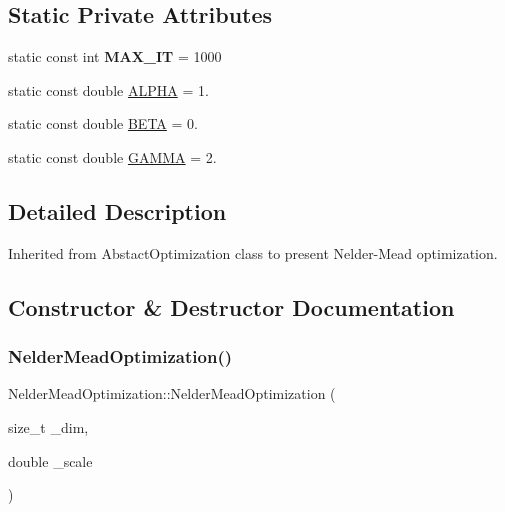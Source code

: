 \subsection*{Static Private Attributes}
\begin{DoxyCompactItemize}
\item 
\mbox{\label{class_nelder_mead_optimization_a55832ed08db34e4009e547ccbfc92f95}} 
static const int {\bfseries M\+A\+X\+\_\+\+IT} = 1000
\item 
static const double \hyperlink{class_nelder_mead_optimization_aa23d74cc1718065309ae6cf0daae7ae2}{A\+L\+P\+HA} = 1.
\item 
static const double \hyperlink{class_nelder_mead_optimization_abcbd4c2b659649dbefe02c231b10fb2b}{B\+E\+TA} = 0.
\item 
static const double \hyperlink{class_nelder_mead_optimization_a67af6800fbfe027f51fd94052b87d615}{G\+A\+M\+MA} = 2.
\end{DoxyCompactItemize}


\subsection{Detailed Description}
Inherited from Abstact\+Optimization class to present Nelder-\/\+Mead optimization. 

\subsection{Constructor \& Destructor Documentation}
\mbox{\label{class_nelder_mead_optimization_a6a733eb1628525f18d098823438cbb94}} 
\subsubsection{\texorpdfstring{Nelder\+Mead\+Optimization()}{NelderMeadOptimization()}}
{\footnotesize\ttfamily Nelder\+Mead\+Optimization\+::\+Nelder\+Mead\+Optimization (\begin{DoxyParamCaption}\item[{size\+\_\+t}]{\+\_\+dim,  }\item[{double}]{\+\_\+scale }\end{DoxyParamCaption})}


